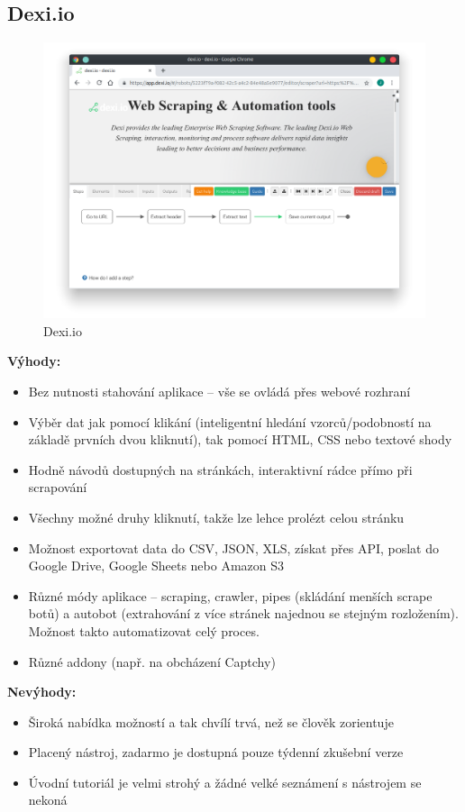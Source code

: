 \documentclass[thesis=B,czech]{FITthesis}[2012/06/26]
\begin{document}
\newpage
\subsection{Dexi.io}
\begin{figure}[h!]
	\includegraphics[width=\linewidth]{images/Dexiio.png}
	\caption{Dexi.io}
	\label{fig:dexi.io}
\end{figure}

\textbf{Výhody:}
\begin{itemize}
	\item Bez nutnosti stahování aplikace -- vše se ovládá přes webové rozhraní
	\item Výběr dat jak pomocí klikání (inteligentní hledání vzorců/podobností na základě prvních dvou kliknutí), tak pomocí HTML, CSS nebo textové shody
	\item Hodně návodů dostupných na stránkách, interaktivní rádce přímo při scrapování
	\item Všechny možné druhy kliknutí, takže lze lehce prolézt celou stránku
	\item Možnost exportovat data do CSV, JSON, XLS, získat přes API, poslat do Google Drive, Google Sheets nebo Amazon S3
	\item Různé módy aplikace -- scraping, crawler, pipes (skládání menších scrape botů) a autobot (extrahování z více stránek najednou se stejným rozložením). Možnost takto automatizovat celý proces.
	\item Různé addony (např. na obcházení Captchy)
\end{itemize}

\textbf{Nevýhody:}
\begin{itemize}
	\item Široká nabídka možností a tak chvílí trvá, než se člověk zorientuje
	\item Placený nástroj, zadarmo je dostupná pouze týdenní zkušební verze
	\item Úvodní tutoriál je velmi strohý a žádné velké seznámení s nástrojem se nekoná
\end{itemize}
\end{document}

